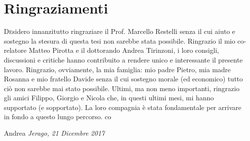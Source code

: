 
\cleardoublepage




\chapter*{Ringraziamenti}

\lettrine[lines=2]{D}esidero innanzitutto ringraziare il Prof. Marcello Restelli senza il cui aiuto e
sostegno la stesura di questa tesi non sarebbe stata possibile. Ringrazio il mio co-relatore Matteo
Pirotta e il dottorando Andrea Tirinzoni, i loro consigli, discussioni e critiche hanno contribuito
a rendere unico e interessante il presente lavoro.\newline
\noindent Ringrazio, ovviamente, la mia famiglia: mio padre Pietro, mia madre Rosanna e mio fratello
Davide senza il cui sostegno morale (ed economico) tutto ciò non sarebbe mai stato possibile.\newline
\noindent Ultimi, ma non meno importanti, ringrazio gli amici Filippo, Giorgio e Nicola che, in questi
ultimi mesi, mi hanno supportato (e sopportato). La loro compagnia è stata fondamentale per arrivare
in fondo a questo lungo percorso.
co
\bigskip

\begin{flushright}
  \hfill Andrea\newline
  \textit{Jerago, 21 Dicembre 2017}
\end{flushright}

